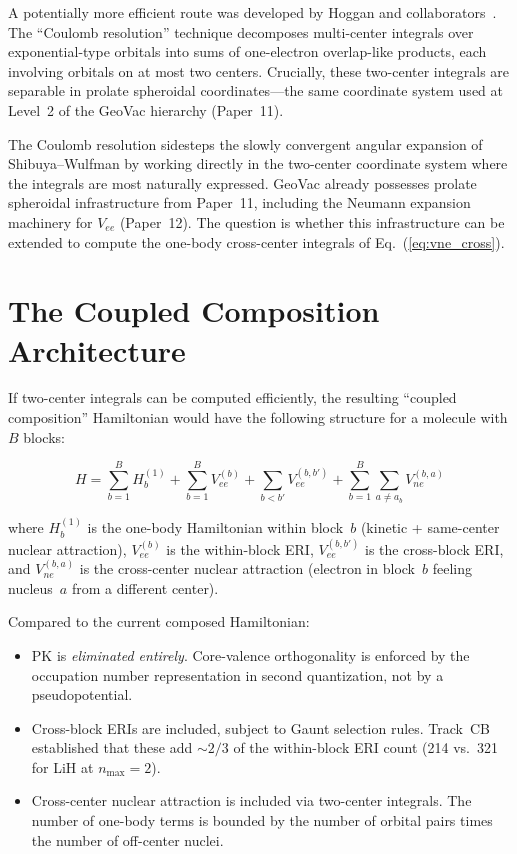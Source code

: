 \documentclass[aps,pra,twocolumn,superscriptaddress,longbibliography]{revtex4-2}
\begin{document}
A potentially more efficient route was developed by Hoggan and
collaborators~\cite{hoggan2011}.  The ``Coulomb resolution'' technique
decomposes multi-center integrals over exponential-type orbitals into
sums of one-electron overlap-like products, each involving orbitals on
at most two centers.  Crucially, these two-center integrals are
separable in prolate spheroidal coordinates---the same coordinate
system used at Level~2 of the GeoVac hierarchy (Paper~11).

The Coulomb resolution sidesteps the slowly convergent angular
expansion of Shibuya--Wulfman by working directly in the two-center
coordinate system where the integrals are most naturally expressed.
GeoVac already possesses prolate spheroidal infrastructure from
Paper~11, including the Neumann expansion machinery for $V_{ee}$
(Paper~12).  The question is whether this infrastructure can be
extended to compute the one-body cross-center integrals of
Eq.~(\ref{eq:vne_cross}).


\section{The Coupled Composition Architecture}
\label{sec:architecture}

If two-center integrals can be computed efficiently, the resulting
``coupled composition'' Hamiltonian would have the following structure
for a molecule with $B$ blocks:

\begin{equation}
\label{eq:coupled}
H = \sum_{b=1}^{B} H_b^{(1)} + \sum_{b=1}^{B} V_{ee}^{(b)} +
\sum_{b < b'} V_{ee}^{(b,b')} + \sum_{b=1}^{B} \sum_{a \ne a_b}
V_{ne}^{(b,a)}
\end{equation}

where $H_b^{(1)}$ is the one-body Hamiltonian within block~$b$
(kinetic + same-center nuclear attraction), $V_{ee}^{(b)}$ is the
within-block ERI, $V_{ee}^{(b,b')}$ is the cross-block ERI, and
$V_{ne}^{(b,a)}$ is the cross-center nuclear attraction (electron in
block~$b$ feeling nucleus~$a$ from a different center).

Compared to the current composed Hamiltonian:
\begin{itemize}
\item PK is \emph{eliminated entirely}.  Core-valence orthogonality is
  enforced by the occupation number representation in second
  quantization, not by a pseudopotential.
\item Cross-block ERIs are included, subject to Gaunt selection rules.
  Track~CB established that these add ${\sim}2/3$ of the within-block
  ERI count (214 vs.~321 for LiH at $n_{\max} = 2$).
\item Cross-center nuclear attraction is included via two-center
  integrals.  The number of one-body terms is bounded by the number
  of orbital pairs times the number of off-center nuclei.
\end{itemize}
\end{document}
